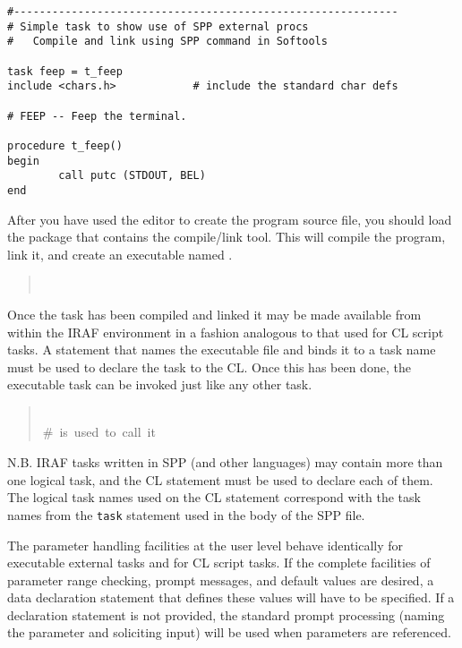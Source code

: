 \begin{verbatim}
#------------------------------------------------------------
# Simple task to show use of SPP external procs
#	Compile and link using SPP command in Softools

task feep = t_feep
include	<chars.h>            # include the standard char defs

# FEEP -- Feep the terminal.

procedure t_feep()
begin
        call putc (STDOUT, BEL)
end
\end{verbatim}

\noindent
After you have used the editor to create the program source file,
you should load the  package that contains
the  compile/link tool.  This will compile the
program, link it, and create an executable named .

\begin{quotation}\noindent
{}  \\
 
\end{quotation}

Once the  task has been compiled and linked
it may be made available from within the IRAF environment
in a fashion analogous to that used for CL script tasks.
A  statement that names the executable file and binds it
to a task name must be used to declare the task to the CL.  Once this
has been done, the executable task can be invoked just like any other
task. 

\begin{quotation}\noindent
{}  \\
  \hfill \#~is~used~to~call~it
\end{quotation}

\noindent
N.B. IRAF tasks written in SPP (and other languages) 
may contain more than one logical task, and the CL 
 statement must be used to declare each of them.
The logical task names used on the CL  statement
 correspond with the task names from  the {\tt task}
statement used in the body of the SPP file.

The parameter handling facilities at the user level behave 
identically for executable 
external tasks and for CL script tasks.  If the complete facilities
of parameter range checking, prompt messages, and default values
are desired, a data declaration statement that defines
these values will have to be  specified.  If a declaration statement 
is not provided, the standard prompt processing (naming the
parameter and soliciting input) will be used when parameters are
referenced.

